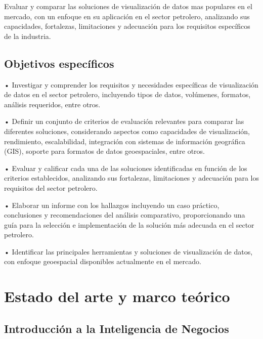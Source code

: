 \documentclass[
  11pt,
  bookmarksnumbered]{article}
\begin{document}
Evaluar y comparar las soluciones de visualización de datos mas populares en el mercado, con un enfoque en su aplicación en el sector petrolero, analizando sus capacidades, fortalezas, limitaciones y adecuación para los requisitos específicos de la industria.

\hypertarget{objetivos-especuxedficos}{%
\subsection{Objetivos específicos}\label{objetivos-especuxedficos}}

• Investigar y comprender los requisitos y necesidades específicas de visualización de datos en el sector petrolero, incluyendo tipos de datos, volúmenes, formatos, análisis requeridos, entre otros.

• Definir un conjunto de criterios de evaluación relevantes para comparar las diferentes soluciones, considerando aspectos como capacidades de visualización, rendimiento, escalabilidad, integración con sistemas de información geográfica (GIS), soporte para formatos de datos geoespaciales, entre otros.

• Evaluar y calificar cada una de las soluciones identificadas en función de los criterios establecidos, analizando sus fortalezas, limitaciones y adecuación para los requisitos del sector petrolero.

• Elaborar un informe con los hallazgos incluyendo un caso práctico, conclusiones y recomendaciones del análisis comparativo, proporcionando una guía para la selección e implementación de la solución más adecuada en el sector petrolero.

• Identificar las principales herramientas y soluciones de visualización de datos, con enfoque geoespacial disponibles actualmente en el mercado.

\hypertarget{estado-del-arte-y-marco-teuxf3rico}{%
\section{\texorpdfstring{\textbf{Estado del arte y marco teórico}}{Estado del arte y marco teórico}}\label{estado-del-arte-y-marco-teuxf3rico}}

\hypertarget{introducciuxf3n-a-la-inteligencia-de-negocios}{%
\subsection{Introducción a la Inteligencia de Negocios}\label{introducciuxf3n-a-la-inteligencia-de-negocios}}
\end{document}
